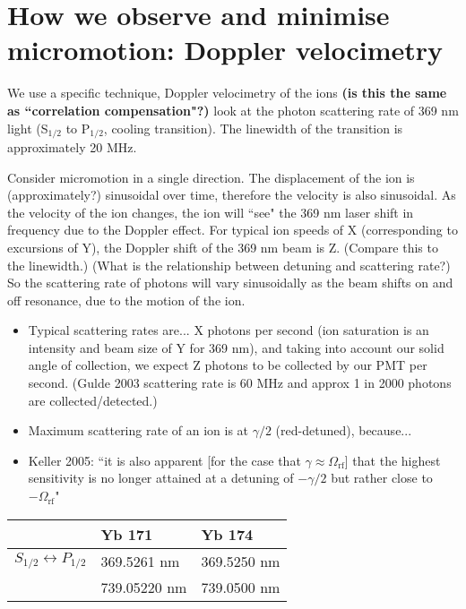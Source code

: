 \documentclass{article}
\begin{document}
\section{How we observe and minimise micromotion: Doppler velocimetry}

We use a specific technique, Doppler velocimetry of the ions \textbf{(is this the same as ``correlation compensation"?)} look at the photon scattering rate of 369 nm light (S$_{1/2}$ to P$_{1/2}$, cooling transition). The linewidth of the transition is approximately 20 MHz.  

Consider micromotion in a single direction. The displacement of the ion is (approximately?) sinusoidal over time, therefore the velocity is also sinusoidal. As the velocity of the ion changes, the ion will ``see" the 369 nm laser shift in frequency due to the Doppler effect. For typical ion speeds of X (corresponding to excursions of Y), the Doppler shift of the 369 nm beam is Z. (Compare this to the linewidth.) (What is the relationship between detuning and scattering rate?) So the scattering rate of photons will vary sinusoidally as the beam shifts on and off resonance, due to the motion of the ion.

\begin{itemize}
\item Typical scattering rates are... X photons per second (ion saturation is an intensity and beam size of Y for 369 nm), and taking into account our solid angle of collection, we expect Z photons to be collected by our PMT per second. (Gulde 2003 scattering rate is 60 MHz and approx 1 in 2000 photons are collected/detected.)
\item Maximum scattering rate of an ion is at $\gamma /2$ (red-detuned), because...
\item Keller 2005: ``it is also apparent [for the case that $\gamma \approx \Omega_{\mathrm{rf}}$] that the highest sensitivity is no longer attained at a detuning of $-\gamma/2$ but rather close to $-\Omega_{\mathrm{rf}}$"
\end{itemize}

\vspace{0mm}
\begin{center}
\begin{tabular}{l l l} \toprule
& \textbf{Yb 171} & \textbf{Yb 174} \\ \midrule
$S_{1/2} \leftrightarrow P_{1/2}$ & 369.5261 nm & 369.5250 nm \\
 & 739.05220 nm & 739.0500 nm \\  
\bottomrule
\end{tabular}
\end{center}
\end{document}
